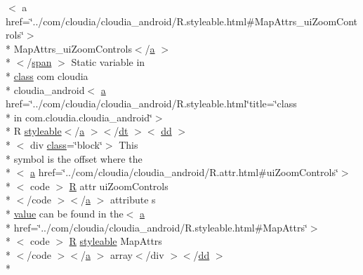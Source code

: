 \begin{DoxyCompactItemize}
$<$ a href=\char`\"{}../com/cloudia/cloudia\-\_\-android/R.\-styleable.\-html\#Map\-Attrs\-\_\-ui\-Zoom\-Controls\char`\"{}$>$\\*
 Map\-Attrs\-\_\-ui\-Zoom\-Controls$<$/\hyperlink{style_8css_a5e8981582017bb8b84c21f148345d1f7}{a} $>$\\*
$<$/\hyperlink{stylesheet_8css_a8343996ebcf16220b04e54659aac31cc}{span} $>$ Static variable in \\*
\hyperlink{_tools_8html_acf06f836132665ba8114f5a414c2403f}{class} com cloudia \\*
cloudia\-\_\-android$<$ \hyperlink{style_8css_a5e8981582017bb8b84c21f148345d1f7}{a} href=\char`\"{}../com/cloudia/cloudia\-\_\-android/R.\-styleable.\-html\char`\"{}title=\char`\"{}class \\*
in com.\-cloudia.\-cloudia\-\_\-android\char`\"{}$>$\\*
 R \hyperlink{index-17_8html_ae6c9bf1e41380184b4b665ca9ab6ba0a}{styleable}$<$/\hyperlink{style_8css_a5e8981582017bb8b84c21f148345d1f7}{a} $>$$<$/\hyperlink{stylesheet_8css_a107565fb4039d33b041380d6e0ea1d80}{dt} $>$$<$ \hyperlink{stylesheet_8css_a47f4718a86835a7771ec592ece845221}{dd} $>$\\*
$<$ div \hyperlink{_tools_8html_acf06f836132665ba8114f5a414c2403f}{class}=\char`\"{}block\char`\"{}$>$ This \\*
symbol is the offset where the\\*
$<$ \hyperlink{style_8css_a5e8981582017bb8b84c21f148345d1f7}{a} href=\char`\"{}../com/cloudia/cloudia\-\_\-android/R.\-attr.\-html\#ui\-Zoom\-Controls\char`\"{}$>$\\*
$<$ code $>$ \hyperlink{index-16_8html_a31e8fe59be5c20ce90a0090e28a0c1fe}{R} attr ui\-Zoom\-Controls\\*
$<$/code $>$$<$/\hyperlink{style_8css_a5e8981582017bb8b84c21f148345d1f7}{a} $>$ attribute s \\*
\hyperlink{_my_s_q_l_connector_8measure_8html_afcc7a4b78ecd8fa7e713f8cfa0f51017}{value} can be found in the$<$ \hyperlink{style_8css_a5e8981582017bb8b84c21f148345d1f7}{a} \\*
href=\char`\"{}../com/cloudia/cloudia\-\_\-android/R.\-styleable.\-html\#Map\-Attrs\char`\"{}$>$\\*
$<$ code $>$ \hyperlink{index-16_8html_a31e8fe59be5c20ce90a0090e28a0c1fe}{R} \hyperlink{index-17_8html_ae6c9bf1e41380184b4b665ca9ab6ba0a}{styleable} Map\-Attrs\\*
$<$/code $>$$<$/\hyperlink{style_8css_a5e8981582017bb8b84c21f148345d1f7}{a} $>$ array$<$/div $>$$<$/\hyperlink{stylesheet_8css_a47f4718a86835a7771ec592ece845221}{dd} $>$\\*
$$
\end{DoxyCompactItemize}
